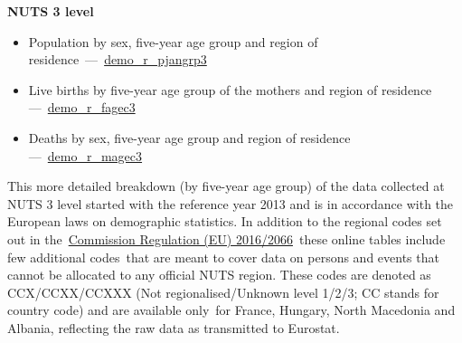 \documentclass[
  letterpaper,
  DIV=11,
  numbers=noendperiod]{scrartcl}
\begin{document}
\textbf{NUTS 3 level}

\begin{itemize}
\item
  Population by sex, five-year age group and region of
  residence~---~\href{http://appsso.eurostat.ec.europa.eu/nui/show.do?query=BOOKMARK_DS-488855_QID_-1CA40564_UID_-3F171EB0\&layout=TIME,C,X,0;GEO,L,Y,0;SEX,L,Z,0;UNIT,L,Z,1;AGE,L,Z,2;INDICATORS,C,Z,3;\&zSelection=DS-488855AGE,TOTAL;DS-488855SEX,T;DS-488855UNIT,NR;DS-488855INDICATORS,OBS_FLAG;\&rankName1=TIME_1_0_0_0\&rankName2=UNIT_1_2_-1_2\&rankName3=GEO_1_2_0_1\&rankName4=AGE_1_2_-1_2\&rankName5=INDICATORS_1_2_-1_2\&rankName6=SEX_1_2_-1_2\&sortC=ASC_-1_FIRST\&rStp=\&cStp=\&rDCh=\&cDCh=\&rDM=true\&cDM=true\&footnes=false\&empty=false\&wai=false\&time_mode=ROLLING\&time_most_recent=false\&lang=EN\&cfo=\%23\%23\%23\%2C\%23\%23\%23.\%23\%23\%23}{demo\_r\_pjangrp3}
\item
  Live births by five-year age group of the mothers and region of
  residence
  ---~\href{http://appsso.eurostat.ec.europa.eu/nui/show.do?query=BOOKMARK_DS-508139_QID_-66CAD533_UID_-3F171EB0\&layout=TIME,C,X,0;GEO,L,Y,0;AGE,L,Z,0;UNIT,L,Z,1;INDICATORS,C,Z,2;\&zSelection=DS-508139UNIT,NR;DS-508139INDICATORS,OBS_FLAG;DS-508139AGE,TOTAL;\&rankName1=TIME_1_0_0_0\&rankName2=UNIT_1_2_-1_2\&rankName3=GEO_1_2_0_1\&rankName4=AGE_1_2_-1_2\&rankName5=INDICATORS_1_2_-1_2\&sortC=ASC_-1_FIRST\&rStp=\&cStp=\&rDCh=\&cDCh=\&rDM=true\&cDM=true\&footnes=false\&empty=false\&wai=false\&time_mode=ROLLING\&time_most_recent=false\&lang=EN\&cfo=\%23\%23\%23\%2C\%23\%23\%23.\%23\%23\%23}{demo\_r\_fagec3}
\item
  Deaths by sex, five-year age group and region of residence
  ---~\href{http://appsso.eurostat.ec.europa.eu/nui/show.do?query=BOOKMARK_DS-508141_QID_77F2D1F1_UID_-3F171EB0\&layout=TIME,C,X,0;GEO,L,Y,0;AGE,L,Z,0;UNIT,L,Z,1;SEX,L,Z,2;INDICATORS,C,Z,3;\&zSelection=DS-508141AGE,TOTAL;DS-508141SEX,T;DS-508141INDICATORS,OBS_FLAG;DS-508141UNIT,NR;\&rankName1=TIME_1_0_0_0\&rankName2=UNIT_1_2_-1_2\&rankName3=GEO_1_2_0_1\&rankName4=AGE_1_2_-1_2\&rankName5=INDICATORS_1_2_-1_2\&rankName6=SEX_1_2_-1_2\&sortC=ASC_-1_FIRST\&rStp=\&cStp=\&rDCh=\&cDCh=\&rDM=true\&cDM=true\&footnes=false\&empty=false\&wai=false\&time_mode=ROLLING\&time_most_recent=false\&lang=EN\&cfo=\%23\%23\%23\%2C\%23\%23\%23.\%23\%23\%23}{demo\_r\_magec3}
\end{itemize}

This more detailed breakdown (by five-year age group) of the data
collected at NUTS 3 level started with the reference year 2013 and is in
accordance with the European laws on demographic statistics. In addition
to the regional codes set out in
the~\href{https://eur-lex.europa.eu/legal-content/EN/TXT/?uri=celex\%3A32016R2066}{Commission
Regulation (EU) 2016/2066}~these online tables include few additional
codes~that are meant to cover data on persons and events that cannot be
allocated to any official NUTS region. These codes are denoted as
CCX/CCXX/CCXXX (Not regionalised/Unknown level 1/2/3; CC stands for
country code) and are available only~for France, Hungary, North
Macedonia and Albania, reflecting the raw data as transmitted to
Eurostat.
\end{document}
